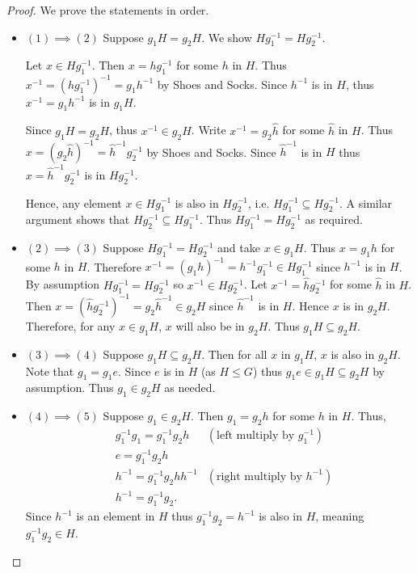 \begin{proof}
    We prove the statements in order.

    \begin{itemize}
        \item $\boxed{(1) \implies (2)}$ Suppose $g_1H = g_2H$. We show $Hg_1^{-1} = Hg_2^{-1}$.

        Let $x \in Hg_1^{-1}$. Then $x = hg_1^{-1}$ for some $h$ in $H$. Thus $x^{-1} = \left(hg_1^{-1}\right)^{-1} = g_1h^{-1}$ by Shoes and Socks. Since $h^{-1}$ is in $H$, thus $x^{-1} = g_1h^{-1}$ is in $g_1H$.

        Since $g_1H = g_2H$, thus $x^{-1} \in g_2H$. Write $x^{-1} = g_2\hat{h}$ for some $\hat{h}$ in $H$. Thus $x = (g_2\hat{h})^{-1} = \hat{h}^{-1}g_2^{-1}$ by Shoes and Socks. Since $\hat{h}^{-1}$ is in $H$ thus $x = \hat{h}^{-1}g_2^{-1}$ is in $Hg_2^{-1}$.

        Hence, any element $x \in Hg_1^{-1}$ is also in $Hg_2^{-1}$, i.e. $Hg_1^{-1} \subseteq Hg_2^{-1}$. A similar argument shows that $Hg_2^{-1} \subseteq Hg_1^{-1}$. Thus $Hg_1^{-1} = Hg_2^{-1}$ as required.

        \item $\boxed{(2) \implies (3)}$ Suppose $Hg_1^{-1} = Hg_2^{-1}$ and take $x \in g_1H$. Thus $x = g_1h$ for some $h$ in $H$. Therefore $x^{-1} = (g_1h)^{-1} = h^{-1}g_1^{-1} \in Hg_1^{-1}$ since $h^{-1}$ is in $H$. By assumption $Hg_1^{-1} = Hg_2^{-1}$ so $x^{-1} \in Hg_2^{-1}$. Let $x^{-1} = \hat{h}g_2^{-1}$ for some $\hat{h}$ in $H$. Then $x = \left(\hat{h}g_2^{-1}\right)^{-1} = g_2\hat{h}^{-1} \in g_2H$ since $\hat{h}^{-1}$ is in $H$. Hence $x$ is in $g_2H$. Therefore, for any $x \in g_1H$, $x$ will also be in $g_2H$. Thus $g_1H \subseteq g_2H$.

        \item $\boxed{(3) \implies (4)}$
        Suppose $g_1H \subseteq g_2H$. Then for all $x$ in $g_1H$, $x$ is also in $g_2H$. Note that $g_1 = g_1e$. Since $e$ is in $H$ (as $H \leq G$) thus $g_1e \in g_1H \subseteq g_2H$ by assumption. Thus $g_1 \in g_2H$ as needed.

        \item $\boxed{(4) \implies (5)}$
        Suppose $g_1 \in g_2H$. Then $g_1 = g_2h$ for some $h$ in $H$. Thus,
        \begin{align*}
            &g_1^{-1}g_1 = g_1^{-1}g_2h & (\text{left multiply by } g_1^{-1})\\
            &e = g_1^{-1}g_2h\\
            &h^{-1} = g_1^{-1}g_2hh^{-1} & (\text{right multiply by } h^{-1})\\
            &h^{-1} = g_1^{-1}g_2.
        \end{align*}
        Since $h^{-1}$ is an element in $H$ thus $g_1^{-1}g_2 = h^{-1}$ is also in $H$, meaning $g_1^{-1}g_2 \in H$.


\end{itemize}
\end{proof}
